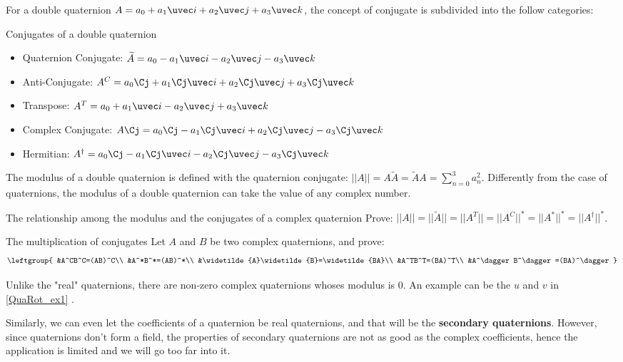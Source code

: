 For a double quaternion $A=a_0+a_1 \uvec i+a_2\uvec j+a_3\uvec k$, the concept of conjugate is subdivided into the follow categories: 

\begin{definition}{Conjugates of a double quaternion}
\begin{itemize}
\item Quaternion Conjugate: $\widetilde{A}=a_0-a_1\uvec i-a_2\uvec j-a_3\uvec k$
\item Anti-Conjugate: $A^C=a_0\Cj + a_1\Cj\uvec i+a_2\Cj\uvec j+a_3\Cj\uvec k$
\item Transpose: $A^T=a_0+a_1\uvec i-a_2\uvec j+a_3\uvec k$
\item Complex Conjugate: $A\Cj=a_0\Cj-a_1\Cj\uvec i+a_2\Cj\uvec j-a_3\Cj\uvec k$
\item Hermitian: $A^\dagger=a_0\Cj-a_1\Cj\uvec i-a_2\Cj\uvec j-a_3\Cj\uvec k$
\end{itemize}
\end{definition}

The modulus of a double quaternion is defined with the quaternion conjugate: $||A||=A\widetilde{A}=\widetilde{A}A=\sum^{3}_{n=0}a^2_n$. Differently from the case of quaternions, the modulus of a double quaternion can take the value of any complex number. 

\begin{exercise}{The relationship among the modulus and the conjugates of a complex quaternion}
Prove: $||A||=||\widetilde{A}||=||A^T||=||A^C||^*=||A^*||^*=||A^\dagger||^*$. 
\end{exercise}

\begin{exercise}{The multiplication of conjugates}
Let $A$ and $B$ be two complex quaternions, and prove:  
\begin{equation}
\leftgroup{
&A^CB^C=(AB)^C\\
&A^*B^*=(AB)^*\\
&\widetilde{A}\widetilde{B}=\widetilde{BA}\\
&A^TB^T=(BA)^T\\
&A^\dagger B^\dagger=(BA)^\dagger
}
\end{equation}

\end{exercise}

Unlike the "real" quaternions, there are non-zero complex quaternions whoses modulus is $0$. An example can be the $u$ and $v$ in \autoref{QuaRot_ex1} . 

Similarly, we can even let the coefficients of a quaternion be real quaternions, and that will be the \textbf{secondary quaternions}. However, since quaternions don't form a field, the properties of secondary quaternions are not as good as the complex coefficients, hence the application is limited and we will go too far into it. 

